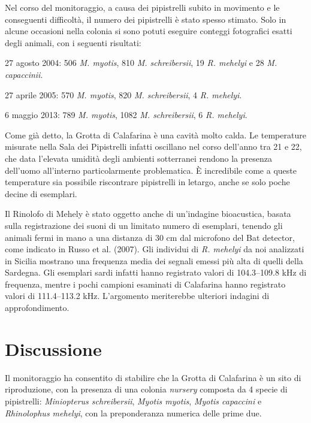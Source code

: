 \begin{multicols}{2}
Nel corso del monitoraggio, a causa dei pipistrelli subito in movimento e le conseguenti difficoltà, il numero dei pipistrelli è stato spesso stimato. Solo in alcune occasioni nella colonia si sono potuti eseguire conteggi fotografici esatti degli animali, con i seguenti risultati:
\begin{compactitem}
\item 27 agosto 2004: 506 \emph{M. myotis}, 810 \emph{M. schreibersii}, 19 \emph{R. mehelyi} e 28 \emph{M. capaccinii}.
\item 27 aprile 2005: 570 \emph{M. myotis}, 820 \emph{M. schreibersii}, 4 \emph{R. mehelyi}.
\item 6 maggio 2013: 789 \emph{M. myotis}, 1082 \emph{M. schreibersii}, 6 \emph{R. mehelyi}.
\end{compactitem}

Come già detto, la Grotta di Calafarina è una cavità molto calda. Le temperature misurate nella Sala dei Pipistrelli infatti oscillano nel corso dell’anno tra 21\celsius{} e 22\celsius{}, che data l’elevata umidità degli ambienti sotterranei rendono la presenza dell’uomo all’interno particolarmente problematica. È incredibile come a queste temperature sia possibile riscontrare pipistrelli in letargo, anche se solo poche decine di esemplari.

Il Rinolofo di Mehely è stato oggetto anche di un’indagine bioacustica, basata sulla registrazione dei suoni di un limitato numero di esemplari, tenendo gli animali fermi in mano a una distanza di 30 cm dal microfono del Bat detector, come indicato in Russo et al. (2007). Gli individui di \emph{R. mehelyi} da noi analizzati in Sicilia mostrano una frequenza media dei segnali emessi più alta di quelli della Sardegna. Gli esemplari sardi infatti hanno registrato valori di 104.3--109.8 kHz di frequenza, mentre i pochi campioni esaminati di Calafarina hanno registrato valori di 111.4--113.2 kHz. L’argomento meriterebbe ulteriori indagini di approfondimento.

\section*{Discussione}
Il monitoraggio ha consentito di stabilire che la Grotta di Calafarina è un sito di riproduzione, con la presenza di una colonia \textit{nursery} composta da 4 specie di pipistrelli: \emph{Miniopterus schreibersii}, \emph{Myotis myotis}, \emph{Myotis capaccini} e \emph{Rhinolophus mehelyi}, con la preponderanza numerica delle prime due.


\end{multicols}

